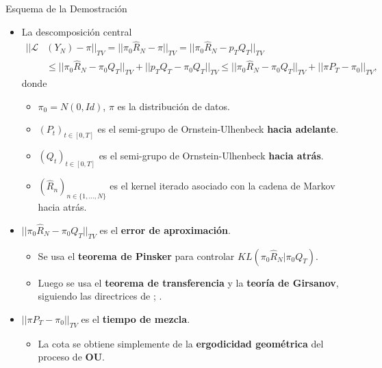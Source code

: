 \documentclass[aspectratio=169,xcolor=dvipsnames, t, spanish]{beamer}
\begin{document}
    \begin{frame}{Esquema de la Demostración}\vspace{-6mm}
        \begin{itemize}
            \item La descomposición central
            \begin{align*}
            ||\mathcal{L}&(Y_{N})-\pi||_{TV} = ||\pi_{0}\hat{R}_{N}-\pi||_{TV} = ||\pi_{0}\hat{R}_{N}-p_{T}Q_{T}||_{TV} \\
            &\le ||\pi_{0}\hat{R}_{N}-\pi_{0}Q_{T}||_{TV}+||p_{T}Q_{T}-\pi_{0}Q_{T}||_{TV} \le ||\pi_{0}\hat{R}_{N}-\pi_{0}Q_{T}||_{TV}+||\pi P_{T}-\pi_{0}||_{TV},
            \end{align*}
            donde
            \begin{itemize}
                \item $\pi_{0}=N(0,Id)$, $\pi$ es la distribución de datos.
                \item $(P_{t})_{t\in[0,T]}$ es el semi-grupo de Ornstein-Ulhenbeck \textbf{hacia adelante}.
                \item $(Q_{t})_{t\in[0,T]}$ es el semi-grupo de Ornstein-Ulhenbeck \textbf{hacia atrás}.
                \item $(\hat{R}_{n})_{n\in\{1,...,N\}}$ es el kernel iterado asociado con la cadena de Markov hacia atrás.
            \end{itemize}
            \item $||\pi_{0}\hat{R}_{N}-\pi_{0}Q_{T}||_{TV}$ es el \textbf{error de aproximación}.
            \begin{itemize}
                \item Se usa el \textbf{teorema de Pinsker} para controlar $KL(\pi_{0}\hat{R}_{N}|\pi_{0}Q_{T})$.
                \item Luego se usa el \textbf{teorema de transferencia} y la \textbf{teoría de Girsanov}, siguiendo las directrices de \cite{DurmusMoulines2017}; \cite{Dalalyan2017}.
            \end{itemize}
            \item $||\pi P_{T}-\pi_{0}||_{TV}$ es el \textbf{tiempo de mezcla}.
            \begin{itemize}
                \item La cota se obtiene simplemente de la \textbf{ergodicidad geométrica} del proceso de \textbf{OU}.
            \end{itemize}
        \end{itemize}
    \end{frame}
    
\end{document}
